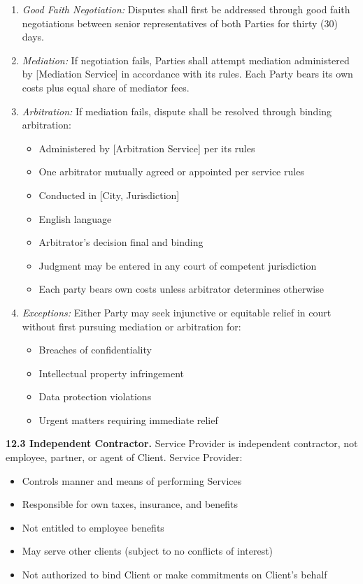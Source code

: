 \documentclass[11pt,a4paper]{article}
\begin{document}
\begin{enumerate}[label=\alph*)]
\item \textit{Good Faith Negotiation:} Disputes shall first be addressed through good faith negotiations between senior representatives of both Parties for thirty (30) days.

\item \textit{Mediation:} If negotiation fails, Parties shall attempt mediation administered by [Mediation Service] in accordance with its rules. Each Party bears its own costs plus equal share of mediator fees.

\item \textit{Arbitration:} If mediation fails, dispute shall be resolved through binding arbitration:
\begin{itemize}
\item Administered by [Arbitration Service] per its rules
\item One arbitrator mutually agreed or appointed per service rules
\item Conducted in [City, Jurisdiction]
\item English language
\item Arbitrator's decision final and binding
\item Judgment may be entered in any court of competent jurisdiction
\item Each party bears own costs unless arbitrator determines otherwise
\end{itemize}

\item \textit{Exceptions:} Either Party may seek injunctive or equitable relief in court without first pursuing mediation or arbitration for:
\begin{itemize}
\item Breaches of confidentiality
\item Intellectual property infringement
\item Data protection violations
\item Urgent matters requiring immediate relief
\end{itemize}
\end{enumerate}

\textbf{12.3 Independent Contractor.} Service Provider is independent contractor, not employee, partner, or agent of Client. Service Provider:
\begin{itemize}
\item Controls manner and means of performing Services
\item Responsible for own taxes, insurance, and benefits
\item Not entitled to employee benefits
\item May serve other clients (subject to no conflicts of interest)
\item Not authorized to bind Client or make commitments on Client's behalf
\end{itemize}
\end{document}
